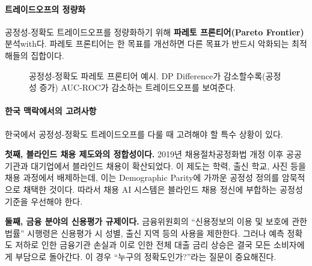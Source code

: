 \paragraph{트레이드오프의 정량화}

공정성-정확도 트레이드오프를 정량화하기 위해 \textbf{파레토 프론티어(Pareto Frontier)} 분석with다. 
파레토 프론티어는 한 목표를 개선하면 다른 목표가 반드시 악화되는 최적해들의 집합이다.

\begin{figure}[htbp]
\centering
{}
\caption{공정성-정확도 파레토 프론티어 예시. 
DP Difference가 감소할수록(공정성 증가) AUC-ROC가 감소하는 트레이드오프를 보여준다.}
\label{fig:pareto_frontier}
\end{figure}


\paragraph{한국 맥락에서의 고려사항}

한국에서 공정성-정확도 트레이드오프를 다룰 때 고려해야 할 특수 상황이 있다.

\textbf{첫째, 블라인드 채용 제도와의 정합성이다.} 
2019년 채용절차공정화법 개정 이후 공공기관과 대기업에서 블라인드 채용이 확산되었다. 
이 제도는 학력, 출신 학교, 사진 등을 채용 과정에서 배제하는데, 
이는 Demographic Parity에 가까운 공정성 정의를 암묵적으로 채택한 것이다. 
따라서 채용 AI 시스템은 블라인드 채용 정신에 부합하는 공정성 기준을 우선해야 한다.

\textbf{둘째, 금융 분야의 신용평가 규제이다.} 
금융위원회의 ``신용정보의 이용 및 보호에 관한 법률'' 시행령은 
신용평가 시 성별, 출신 지역 등의 사용을 제한한다. 
그러나 예측 정확도 저하로 인한 금융기관 손실과 이로 인한 전체 대출 금리 상승은 
결국 모든 소비자에게 부담으로 돌아간다. 
이 경우 ``누구의 정확도인가?''라는 질문이 중요해진다.

